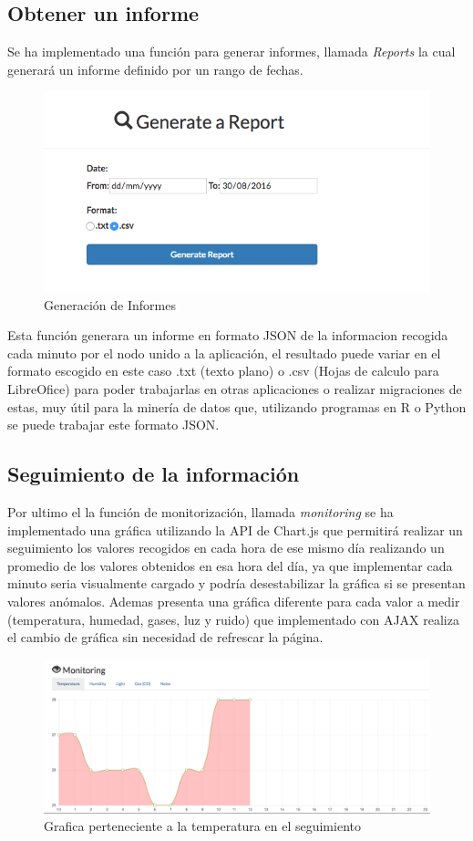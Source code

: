 \subsection{Obtener un informe}

Se ha implementado una función para generar informes, llamada \textit{Reports} la cual generará un informe definido por un rango de fechas.

\begin{figure}[!h]
	\centering
	\includegraphics[width=0.8\linewidth]{figuras/nodereports2}
	\caption{Generación de Informes}
	\label{fig:nodereport}
\end{figure}

Esta función generara un informe en formato JSON de la informacion recogida cada minuto por el nodo unido a la aplicación, el resultado puede variar en el formato escogido en este caso .txt (texto plano) o .csv (Hojas de calculo para LibreOfice) para poder trabajarlas en otras aplicaciones o realizar migraciones de estas, muy útil para la minería de datos que, utilizando programas en R o Python se puede trabajar este formato JSON.

\subsection{Seguimiento de la información}

Por ultimo el la función de monitorización, llamada \textit{monitoring} se ha implementado una gráfica utilizando la API de Chart.js que permitirá realizar un seguimiento los valores recogidos en cada hora de ese mismo día realizando un promedio de los valores obtenidos en esa hora del día, ya que implementar cada minuto seria visualmente cargado y podría desestabilizar la gráfica si se presentan valores anómalos. 
Ademas presenta una gráfica diferente para cada valor a medir (temperatura, humedad, gases, luz y ruido) que implementado con AJAX realiza el cambio de gráfica sin necesidad de refrescar la página.

\begin{figure}[!h]
	\centering
	\includegraphics[width=0.9\linewidth]{figuras/nodereports3}
	\caption{Grafica perteneciente a la temperatura en el seguimiento}
	\label{fig:nodereport}
\end{figure}


